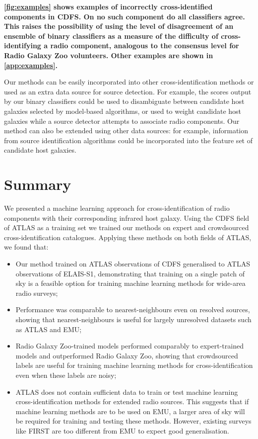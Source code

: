 \documentclass[fleqn,usenatbib,usedcolumn]{mnras}
\newcommand{\edited}[1]{{\bf {#1}}}
\begin{document}
  \edited{\autoref{fig:examples} shows examples of incorrectly cross-identified
  components in CDFS. On no such component do all classifiers agree.
  This raises the possibility of using the level of disagreement of an
  ensemble of binary classifiers as a measure of the difficulty of cross-identifying a radio component,
  analogous to the consensus level for Radio Galaxy Zoo volunteers. Other examples are shown in \autoref{app:examples}.}

  Our methods can be easily incorporated into other cross-identification
  methods or used as an extra data source for source detection. For
  example, the scores output by our binary classifiers could be used to
  disambiguate between candidate host
  galaxies selected by model-based algorithms, or used to weight candidate
  host galaxies while a source detector attempts to associate radio
  components. Our method can also be extended using other data sources: for
  example, information from source identification algorithms could be
  incorporated into the feature set of candidate host galaxies.

\section{Summary}

  We presented a machine learning approach for cross-identification of radio
  components with their corresponding infrared host galaxy. Using the CDFS
  field of ATLAS as a training set we trained our
  methods on expert and crowdsourced cross-identification catalogues.
  Applying these methods on both fields of ATLAS, we found that:
  \begin{itemize}
    \item Our method trained on ATLAS observations of CDFS generalised to
    ATLAS observations of ELAIS-S1, demonstrating that training on a single
    patch of sky is a feasible option for training machine learning methods
    for wide-area radio surveys;
    \item Performance was comparable to nearest-neighbours even on resolved
    sources, showing that nearest-neighbours is useful for largely unresolved
    datasets such as ATLAS and EMU;
    \item Radio Galaxy Zoo-trained models performed comparably to
    expert-trained models and outperformed Radio Galaxy Zoo, showing that
    crowdsourced labels are useful for training machine learning methods for
    cross-identification even when these labels are noisy;
    \item ATLAS does not contain sufficient data to train or test machine
    learning cross-identification methods for extended radio sources. This
    suggests that if machine learning methods are to be used on EMU, a larger
    area of sky will be required for training and testing these methods.
    However, existing surveys like FIRST are too different from EMU to expect
    good generalisation.
  \end{itemize}
\end{document}
